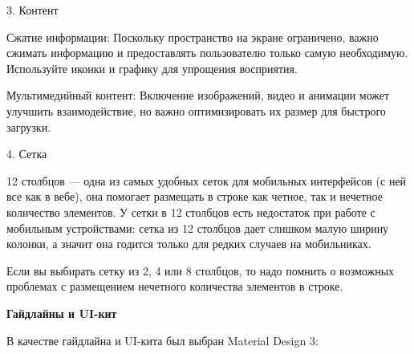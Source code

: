 3. Контент

    Сжатие информации: Поскольку пространство на экране ограничено, важно сжимать информацию и предоставлять пользователю только самую необходимую. Используйте иконки и графику для упрощения восприятия.

    Мультимедийный контент: Включение изображений, видео и анимации может улучшить взаимодействие, но важно оптимизировать их размер для быстрого загрузки.

4. Сетка

    12 столбцов — одна из самых удобных сеток для мобильных интерфейсов (с ней все как в вебе), она помогает размещать в строке как четное, так и нечетное количество элементов. У сетки в 12 столбцов есть недостаток при работе с мобильным устройствами: сетка из 12 столбцов дает слишком малую ширину колонки, а значит она годится только для редких случаев на мобильниках.

    Если вы выбирать сетку из 2, 4 или 8 столбцов, то надо помнить о возможных проблемах с размещением нечетного количества элементов в строке.

\textbf{Гайдлайны и UI-кит}
\bigskip

В качестве гайдлайна и UI-кита был выбран Material Design 3:

